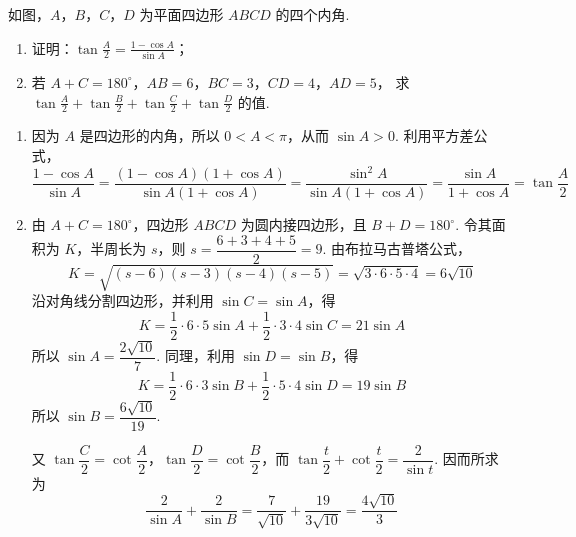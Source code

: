 \begin{problem}
如图，\(A\)，\(B\)，\(C\)，\(D\) 为平面四边形 \(ABCD\) 的四个内角.
\begin{enumerate}
\item 证明：\(\tan \frac{A}{2} = \frac{1 - \cos A}{\sin A}\)；
\item 若 \(A + C = 180^{\circ}\)，\(AB = 6\)，\(BC = 3\)，\(CD = 4\)，\(AD = 5\)， 求 \(\tan \frac{A}{2} + \tan \frac{B}{2} + \tan \frac{C}{2} + \tan \frac{D}{2}\) 的值.
\end{enumerate}

\begin{solution}
\begin{enumerate}
\item 因为 \(A\) 是四边形的内角，所以 \(0<A<\pi\)，从而 \(\sin A>0\). 利用平方差公式，
\[
\frac{1-\cos A}{\sin A}=\frac{(1-\cos A)(1+\cos A)}{\sin A(1+\cos A)}
=\frac{\sin^2A}{\sin A(1+\cos A)}
=\frac{\sin A}{1+\cos A}
=\tan\frac A2
\]
\item 由 \(A+C=180^{\circ}\)，四边形 \(ABCD\) 为圆内接四边形，且 \(B+D=180^{\circ}\). 令其面积为 \(K\)，半周长为 \(s\)，则 \(s=\dfrac{6+3+4+5}{2}=9\). 由布拉马古普塔公式，
\[
K=\sqrt{(s-6)(s-3)(s-4)(s-5)}=\sqrt{3\cdot6\cdot5\cdot4}=6\sqrt{10}
\]
沿对角线分割四边形，并利用 \(\sin C=\sin A\)，得
\[
K=\frac12\cdot6\cdot5\sin A+\frac12\cdot3\cdot4\sin C=21\sin A
\]
所以 \(\sin A=\dfrac{2\sqrt{10}}7\). 同理，利用 \(\sin D=\sin B\)，得
\[
K=\frac12\cdot6\cdot3\sin B+\frac12\cdot5\cdot4\sin D=19\sin B
\]
所以 \(\sin B=\dfrac{6\sqrt{10}}{19}\).

又 \(\tan\dfrac C2=\cot\dfrac A2\)，\(\tan\dfrac D2=\cot\dfrac B2\)，而 \(\tan\dfrac t2+\cot\dfrac t2=\dfrac2{\sin t}\). 因而所求为
\[
\frac2{\sin A}+\frac2{\sin B}=\frac7{\sqrt{10}}+\frac{19}{3\sqrt{10}}=\frac{4\sqrt{10}}3
\]
\end{enumerate}
\end{solution}
\end{problem}

